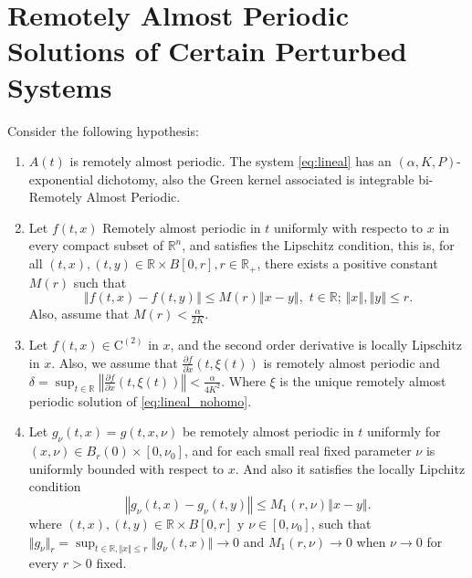 \documentclass[english,reqno]{amsart}
\numberwithin{equation}{section}
\theoremstyle{plain}
\theoremstyle{definition}
\theoremstyle{remark}
\newcommand{\bb}[1]{{\mathbb{#1}}}
\begin{document}
%

\section{Remotely Almost Periodic Solutions of Certain Perturbed Systems}



Consider the following hypothesis:

\begin{enumerate}[label=(\textbf{H.\arabic*})]

\item \label{H1} $A(t)$ is remotely almost periodic. The system \eqref{eq:lineal} has an $(\alpha,K,P)$-exponential dichotomy, also the Green kernel associated is integrable bi-Remotely Almost Periodic.

\item\label{H2}  Let $f\left(t,x\right)$ Remotely almost periodic in $t$ uniformly with respecto to $x$ in every compact subset of $\bb{R}^{n}$, and satisfies the Lipschitz condition, this is, for all $\left(t,x\right),\left(t,y\right)\in\mathbb{R}\times B\left[0,r\right], r\in\bb{R}_{+}$,
there exists a positive constant $M(r)$ such that 
\[
\left\Vert f\left(t,x\right)-f\left(t,y\right)\right\Vert \leq M\left(r\right)\left\Vert x-y\right\Vert ,\,\, t\in\mathbb{R};\,\left\Vert x\right\Vert ,\left\Vert y\right\Vert \leq r.
\]
Also, assume that $M\left(r\right)<\frac{\alpha}{2K}$.

\item\label{H3} Let $f\left(t,x\right)\in\mbox{C}^{\left(2\right)}$
in $x$, and the second order derivative is locally Lipschitz in $x$. Also, we assume that  $\frac{\partial f}{\partial x}\left(t,\xi\left(t\right)\right)$
is remotely almost periodic and $\delta=\sup_{t\in\mathbb{R}}\left\Vert \frac{\partial f}{\partial x}\left(t,\xi\left(t\right)\right)\right\Vert <\frac{\alpha}{4K^{2}}.$ Where $\xi$ is the unique remotely almost periodic solution of \eqref{eq:lineal_nohomo}.

\item \label{H4} Let $g_{\nu}\left(t,x\right)=g\left(t,x,\nu\right)$
be remotely almost periodic in $t$ uniformly for $(x,\nu)\in B_r(0)\times [0,\nu_0]$, and for each small real fixed parameter $\nu$ is uniformly bounded with respect to $x$. And also it satisfies the locally Lipchitz condition
\[
\left\Vert g_{\nu}\left(t,x\right)-g_{\nu}\left(t,y\right)\right\Vert \leq M_{1}\left(r,\nu\right)\left\Vert x-y\right\Vert.
\]
where $\left(t,x\right),\left(t,y\right)\in\mathbb{R}\times B\left[0,r\right]\mbox{ y }\nu\in\left[0,\nu_{0}\right]$, such that
 $\displaystyle{\Vert g_{\nu}\Vert_{r}=\sup_{t\in\bb{R}, \Vert x\Vert\leq r } \Vert g_{\nu}(t,x)\Vert \rightarrow 0}$ and $M_{1}\left(r,\nu \right)\rightarrow 0$   when $\nu\rightarrow 0$ for every $r>0$ fixed.
\end{enumerate}
\end{document}
